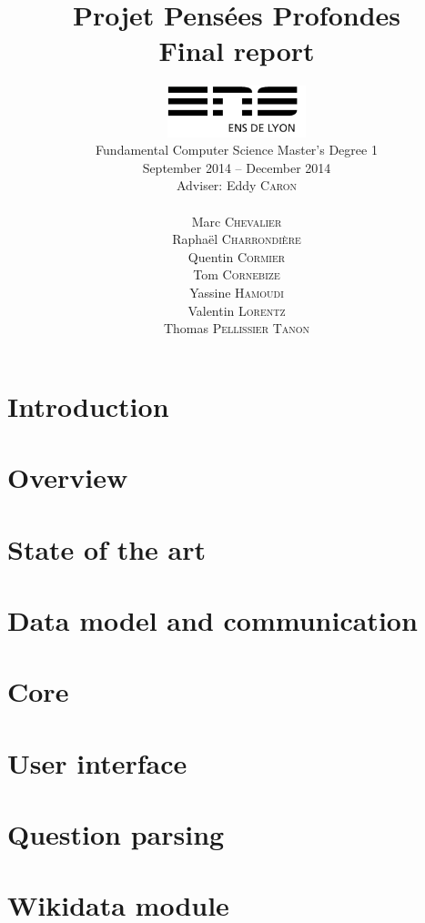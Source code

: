 \documentclass[a4paper,10pt]{report}
\title{Projet Pensées Profondes\\\large Final report}
\author{\includegraphics[width=0.3\textwidth]{../logo_ensl.pdf}\\[50pt]
Fundamental Computer Science Master's Degree 1\\September 2014 \--- December 2014\\[50pt]
Adviser: Eddy \textsc{Caron}\\[50pt]
\begin{minipage}{0.4\textwidth}
    \begin{flushleft} \large
        Marc \textsc{Chevalier}
        \\
        Raphaël \textsc{Charrondière}
        \\
        Quentin \textsc{Cormier}
        \\
        Tom \textsc{Cornebize}
    \end{flushleft}
\end{minipage}
\begin{minipage}{0.4\textwidth}
    \begin{flushright} \large
        Yassine \textsc{Hamoudi}
        \\
        Valentin \textsc{Lorentz}
        \\
        Thomas \textsc{Pellissier Tanon}
        \\
    \end{flushright}
\end{minipage}
}
\date{}
\begin{document}
\maketitle

\tableofcontents

\chapter*{Introduction}
    \label{introduction}
    

\chapter{Overview}
    

\chapter{State of the art}
    \label{stateofart}
    

\chapter{Data model and communication}
    \label{datamodel}
    

\chapter{Core}
    \label{core}
    

\chapter{User interface}
    \label{UI}
    

\chapter{Question parsing}
    \label{questionparsing}
    
    \label{grammatical}
    
    \label{reformulation}
    
    \label{standalone}
    

\chapter{Wikidata module}
    \label{wikidata}
    
    
\end{document}
